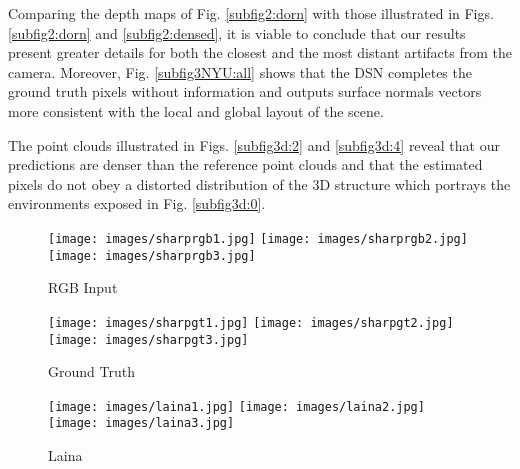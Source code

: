 \documentclass[5p]{elsarticle}
\begin{document}
Comparing the depth maps of Fig. \ref{subfig2:dorn} with those illustrated in Figs. \ref{subfig2:dorn} and \ref{subfig2:densed}, it is viable to conclude that our results present greater details for both the closest and the most distant artifacts from the camera. Moreover, Fig. \ref{subfig3NYU:all} shows that the DSN completes the ground truth pixels without information and outputs surface normals vectors more consistent with the local and global layout of the scene.

The point clouds illustrated in Figs. \ref{subfig3d:2} and \ref{subfig3d:4} reveal that our predictions are denser than the reference point clouds and that the estimated pixels do not obey a distorted distribution of the 3D structure which portrays the environments exposed in Fig. \ref{subfig3d:0}. 

\begin{figure*}[t!]
     \centering
          \begin{subfigure}[t]{0.16\textwidth}
         \centering
         \caption{RGB Input}
         \texttt{[image: images/sharprgb1.jpg]}
         \hspace{1em}
         \texttt{[image: images/sharprgb2.jpg]}
         \hspace{1em}
         \texttt{[image: images/sharprgb3.jpg]}
         \label{subfig1:rgb}
     \end{subfigure}
     \begin{subfigure}[t]{0.16\textwidth}
         \centering
         \caption{Ground Truth}
         \texttt{[image: images/sharpgt1.jpg]}
         \hspace{1em}
         \texttt{[image: images/sharpgt2.jpg]}
         \hspace{1em}
         \texttt{[image: images/sharpgt3.jpg]}
         \label{subfig1:gt}
     \end{subfigure}
         \begin{subfigure}[t]{0.16\textwidth}
         \centering
         \caption{Laina \etal \cite{laina2016deeper}}
         \texttt{[image: images/laina1.jpg]}
         \hspace{1em}
         \texttt{[image: images/laina2.jpg]}
         \hspace{1em}
         \texttt{[image: images/laina3.jpg]}
         \label{subfig1:laina}
     \end{subfigure}
     \begin{subfigure}[t]{0.16\textwidth}

\end{subfigure}
\end{figure*}
\end{document}
